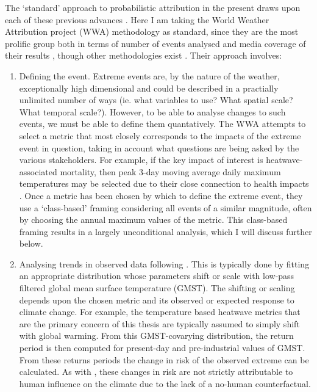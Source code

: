     The `standard' approach to probabilistic attribution in the present draws upon each of these previous advances \citep{philip_protocol_2020}. Here I am taking the World Weather Attribution project (WWA) methodology as standard, since they are the most prolific group both in terms of number of events analysed and media coverage of their results \citep{van_oldenborgh_pathways_2021}, though other methodologies exist \citep{lewis_anthropogenic_2013}. Their approach involves:
    \begin{enumerate}
      \item Defining the event. Extreme events are, by the nature of the weather, exceptionally high dimensional and could be described in a practially unlimited number of ways (ie. what variables to use? What spatial scale? What temporal scale?). However, to be able to analyse changes to such events, we must be able to define them quantatively. The WWA attempts to select a metric that most closely corresponds to the impacts of the extreme event in question, taking in account what questions are being asked by the various stakeholders. For example, if the key impact of interest is heatwave-associated mortality, then peak 3-day moving average daily maximum temperatures may be selected due to their close connection to health impacts \citep{dippoliti_impact_2010}. Once a metric has been chosen by which to define the extreme event, they use a `class-based' framing considering all events of a similar magnitude, often by choosing the annual maximum values of the metric. This class-based framing results in a largely unconditional analysis, which I will discuss further below.
      \item Analysing trends in observed data following \citet{van_oldenborgh_how_2007}. This is typically done by fitting an appropriate distribution whose parameters shift or scale with low-pass filtered global mean surface temperature (GMST). The shifting or scaling depends upon the chosen metric and its observed or expected response to climate change. For example, the temperature based heatwave metrics that are the primary concern of this thesis are typically assumed to simply shift with global warming. From this GMST-covarying distribution, the return period is then computed for present-day and pre-industrial values of GMST. From these returns periods the change in risk of the observed extreme can be calculated. As with \citet{van_oldenborgh_how_2007}, these changes in risk are not strictly attributable to human influence on the climate due to the lack of a no-human counterfactual.

\end{enumerate}
